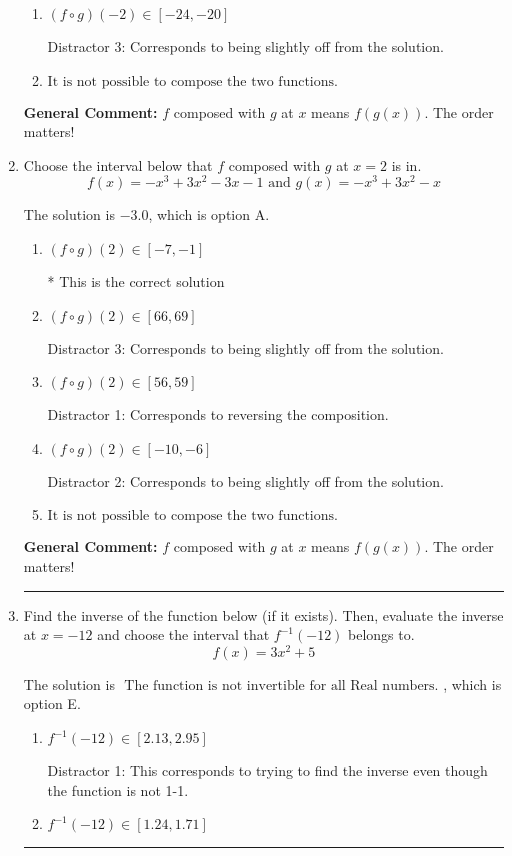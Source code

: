 \documentclass{extbook}[14pt]
\newcommand{\litem}[1]{\item #1

\rule{\textwidth}{0.4pt}}
\begin{document}
\begin{enumerate}
{\begin{enumerate}[label=\Alph*.]
 Distractor 2: Corresponds to being slightly off from the solution.
\item \( (f \circ g)(-2) \in [-24, -20] \)

 Distractor 3: Corresponds to being slightly off from the solution.
\item \( \text{It is not possible to compose the two functions.} \)


\end{enumerate}

\textbf{General Comment:} $f$ composed with $g$ at $x$ means $f(g(x))$. The order matters!
}
\litem{
Choose the interval below that $f$ composed with $g$ at $x=2$ is in.
\[ f(x) = -x^{3} +3 x^{2} -3 x -1 \text{ and } g(x) = -x^{3} +3 x^{2} -x \]

The solution is \( -3.0 \), which is option A.\begin{enumerate}[label=\Alph*.]
\item \( (f \circ g)(2) \in [-7, -1] \)

* This is the correct solution
\item \( (f \circ g)(2) \in [66, 69] \)

 Distractor 3: Corresponds to being slightly off from the solution.
\item \( (f \circ g)(2) \in [56, 59] \)

 Distractor 1: Corresponds to reversing the composition.
\item \( (f \circ g)(2) \in [-10, -6] \)

 Distractor 2: Corresponds to being slightly off from the solution.
\item \( \text{It is not possible to compose the two functions.} \)


\end{enumerate}

\textbf{General Comment:} $f$ composed with $g$ at $x$ means $f(g(x))$. The order matters!
}
\litem{
Find the inverse of the function below (if it exists). Then, evaluate the inverse at $x = -12$ and choose the interval that $f^{-1}(-12)$ belongs to.
\[ f(x) = 3 x^2 + 5 \]

The solution is \( \text{ The function is not invertible for all Real numbers. } \), which is option E.\begin{enumerate}[label=\Alph*.]
\item \( f^{-1}(-12) \in [2.13, 2.95] \)

 Distractor 1: This corresponds to trying to find the inverse even though the function is not 1-1. 
\item \( f^{-1}(-12) \in [1.24, 1.71] \)


\end{enumerate}}
\end{enumerate}
\end{document}
